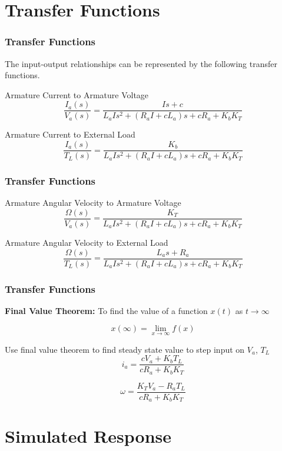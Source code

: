\documentclass[fleqn]{beamer}                  %
\newcommand{\sectiontitleIV}{Transfer Functions}
\newcommand{\sectiontitleV}{Simulated Response}
\begin{document}
\section{\sectiontitleIV}

	\begin{frame}[label=sectionIV] \small
		\frametitle{\sectiontitleIV}
		The input-output relationships can be represented by the following transfer functions.\vspc

		Armature Current to Armature Voltage
		\[\frac{I_a\left(s\right)}{V_a\left(s\right)}=\frac{Is+c}{L_aIs^2+\left(R_aI+cL_a\right)s+cR_a+K_bK_T}\]
		
		Armature Current to External Load
		\[\frac{I_a\left(s\right)}{T_L\left(s\right)}=\frac{K_b}{L_aIs^2+\left(R_aI+cL_a\right)s+cR_a+K_bK_T}\]

	\end{frame}	

	\begin{frame}[label=sectionIV] \small
		\frametitle{\sectiontitleIV}

		Armature Angular Velocity to Armature Voltage
		\[\frac{\Omega\left(s\right)}{V_a\left(s\right)}=\frac{K_T}{L_aIs^2+\left(R_aI+cL_a\right)s+cR_a+K_bK_T}\]
		
		Armature Angular Velocity to External Load
		\[\frac{\Omega\left(s\right)}{T_L\left(s\right)}=\frac{L_as+R_a}{L_aIs^2+\left(R_aI+cL_a\right)s+cR_a+K_bK_T}\]
		
	\end{frame}	

	\begin{frame}[label=sectionIV] \small
		\frametitle{\sectiontitleIV}

		\textbf{Final Value Theorem:} 
		To find the value of a function $x(t)$ as $t\rightarrow \infty$  

		\[x\left(\infty\right)=\lim_{x\to\infty} f(x)\]

		Use final value theorem to find steady state value to step input on $V_a$, $T_L$
		\[i_a=\frac{cV_a + K_bT_L}{cR_a+K_bK_T}\]

		\[\omega=\frac{K_TV_a-R_aT_L}{cR_a+K_bK_T}\]

	\end{frame}

\section{\sectiontitleV}
\end{document}
